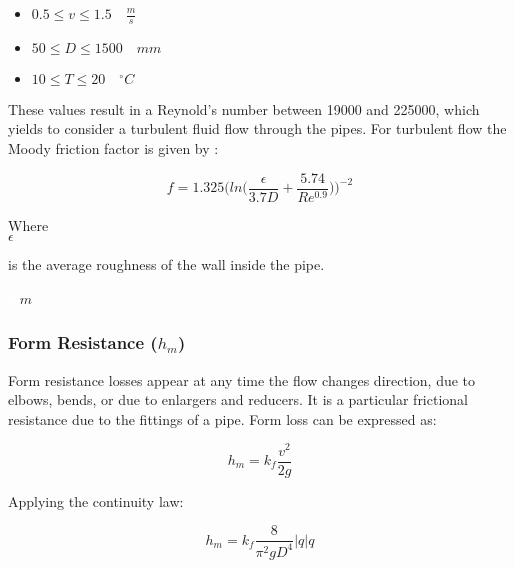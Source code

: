 \begin{itemize}
  \item $0.5 \leq v \leq 1.5  \quad \frac{m}{s}$
  \item $50 \leq D \leq 1500\quad mm$
  \item $10 \leq T \leq 20 \quad ^{\circ} C$
\end{itemize}


These values result in a Reynold's number between 19000 and 225000, which yields to consider a turbulent fluid flow through the pipes. For turbulent flow the 
Moody friction factor is given by \cite{Design_Water}: 

\begin{equation}
  f = 1.325 \bigg(ln\bigg(\frac{\epsilon}{3.7 D}+\frac{5.74}{Re^{0.9}}\bigg)\bigg)^{-2}
  \label{turbulent}
\end{equation}

\begin{minipage}[t]{0.20\textwidth}
Where\\
\hspace*{8mm} $\epsilon$ 
\end{minipage}
\begin{minipage}[t]{0.68\textwidth}
\vspace*{2mm}
is the average roughness of the wall inside the pipe.
 \end{minipage}
\begin{minipage}[t]{0.10\textwidth}
\vspace*{2mm}
\textcolor{White}{te}$\unit{m}$
\end{minipage}

%
\subsubsection{Form Resistance (\texorpdfstring{$h_m$}{})} 
Form resistance losses appear at any time the flow changes direction, due to elbows, bends,
or due to enlargers and reducers. It is a particular frictional resistance due to the 
fittings of a pipe. Form loss can be expressed as:

\begin{equation}
  h_m = k_f \frac{v^2}{2g}
\end{equation}


Applying the continuity law:

\begin{equation}
   h_m = k_f \frac{8}{\pi^2gD^4}  |q| q
\label{Formloss}
\end{equation}

